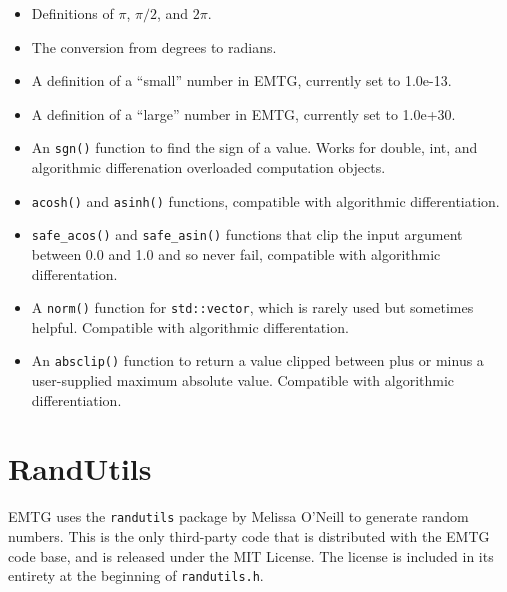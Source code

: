 \begin{itemize}
	\item Definitions of $\pi$, $\pi/2$, and $2\pi$.
	\item The conversion from degrees to radians.
	\item A definition of a ``small'' number in \ac{EMTG}, currently set to 1.0e-13.
	\item A definition of a ``large'' number in \ac{EMTG}, currently set to 1.0e+30.
	\item An \texttt{sgn()} function to find the sign of a value. Works for double, int, and algorithmic differenation overloaded computation objects.
	\item \texttt{acosh()} and \texttt{asinh()} functions, compatible with algorithmic differentiation.
	\item \texttt{safe\_acos()} and \texttt{safe\_asin()} functions that clip the input argument between 0.0 and 1.0 and so never fail, compatible with algorithmic differentation.
	\item A \texttt{norm()} function for \texttt{std::vector}, which is rarely used but sometimes helpful. Compatible with algorithmic differentation.
	\item An \texttt{absclip()} function to return a value clipped between plus or minus a user-supplied maximum absolute value. Compatible with algorithmic differentiation.
\end{itemize}

\section{RandUtils}
\label{sec:randutils}

\ac{EMTG} uses the \texttt{randutils} package by Melissa O'Neill to generate random numbers. This is the only third-party code that is distributed with the \ac{EMTG} code base, and is released under the MIT License. The license is included in its entirety at the beginning of \texttt{randutils.h}.